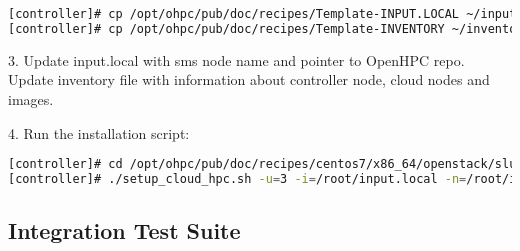 \begin{lstlisting}[language=bash,keywords={},upquote=true]
[controller]# cp /opt/ohpc/pub/doc/recipes/Template-INPUT.LOCAL ~/input.local
[controller]# cp /opt/ohpc/pub/doc/recipes/Template-INVENTORY ~/inventory
\end{lstlisting}

3. Update input.local with sms node name and pointer to OpenHPC repo. Update inventory file with information about controller node, cloud nodes and images.

4. Run the installation script:

\begin{lstlisting}[language=bash,keywords={},upquote=true]
[controller]# cd /opt/ohpc/pub/doc/recipes/centos7/x86_64/openstack/slurm/
[controller]# ./setup_cloud_hpc.sh -u=3 -i=/root/input.local -n=/root/inventory
\end{lstlisting}


\newpage
\subsection{Integration Test Suite}
	

